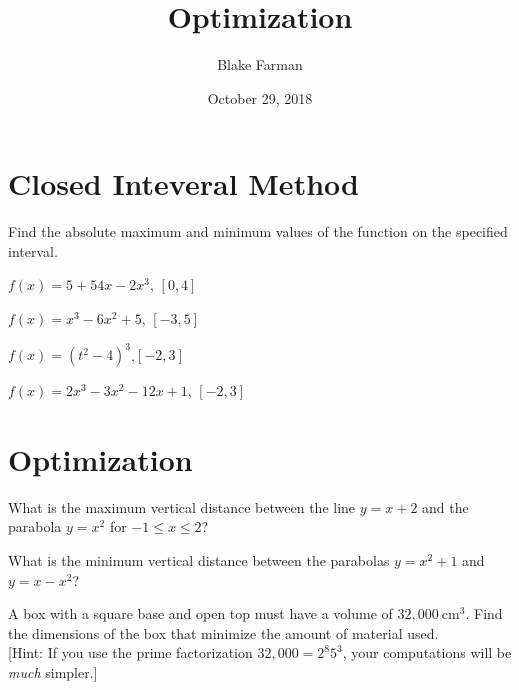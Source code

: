 \documentclass[10pt]{amsart}
\title{Optimization}
\date{October 29, 2018}
\author{Blake Farman}
\begin{document}
\maketitle

\makenameslot

\section*{Closed Inteveral Method}
\noindent Find the absolute maximum and minimum values of the function on the specified interval.
\begin{multicols}{2}
  \begin{thm}
    \(f(x) = 5 + 54x - 2x^3\), \([0,4]\)
  \end{thm}

  \begin{thm}
    \(f(x) = x^3 - 6x^2 + 5\), \([-3,5]\)
  \end{thm}
\end{multicols}

\vspace{2in}
\begin{multicols}{2}
  \begin{thm}
    \(f(x) = (t^2 - 4)^3\),\([-2,3]\)
  \end{thm}

  \begin{thm}
    \(f(x) = 2x^3 - 3x^2 - 12x + 1\), \([-2,3]\)
  \end{thm}
\end{multicols}

\newpage

\section*{Optimization}
\begin{thm}
  What is the maximum vertical distance between the line \(y = x + 2\) and the parabola \(y = x^2\) for \(-1 \leq x \leq 2\)?
\end{thm}

\vspace{3in}

\begin{thm}
  What is the minimum vertical distance between the parabolas \(y = x^2 + 1\) and \(y = x - x^2\)?
\end{thm}

\newpage

\begin{thm}
  A box with a square base and open top must have a volume of \(32,000\ \text{cm}^3\).
  Find the dimensions of the box that minimize the amount of material used.\\
  {[Hint: If you use the prime factorization \(32,000 = 2^8 5^3\), your computations will be \textit{much} simpler.]}
\end{thm}
\end{document}
